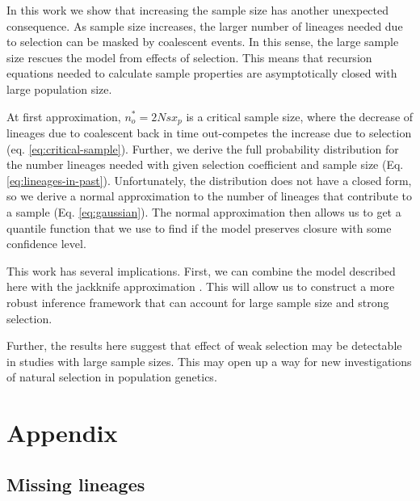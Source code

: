 \documentclass[review]{elsarticle}
\begin{document}
In this work we show that increasing the sample size has another unexpected consequence. As sample
size increases, the larger number of lineages needed due to selection can be masked by coalescent
events. In this sense, the large sample size rescues the model from effects of selection. This means
that recursion equations needed to calculate sample properties are asymptotically closed with large
population size.

At first approximation, $n_o^*=2Nsx_p$ is a critical sample size, where the decrease of lineages due to
coalescent back in time out-competes the increase due to selection (eq. \ref{eq:critical-sample}).
Further, we derive the full probability distribution for the number lineages needed with given
selection coefficient and sample size (Eq. \ref{eq:lineages-in-past}). Unfortunately, the
distribution does not have a closed form, so we derive a normal approximation to the number of
lineages that contribute to a sample (Eq. \ref{eq:gaussian}). The normal approximation
then allows us to get a quantile function that we use to find if the model preserves closure with
some confidence level.

This work has several implications. First, we can combine the model described here with the
jackknife approximation \citep{JouganousEtAl2017}. This will allow us to construct a more robust
inference framework that can account for large sample size and strong selection.

Further, the results here suggest that effect of weak selection may be detectable in studies with
large sample sizes. This may open up a way for new investigations of natural selection in population
genetics.



\section{Appendix}
\renewcommand{\thefigure}{S\arabic{figure}}
\setcounter{figure}{0}

\subsection{Missing lineages}
\end{document}

